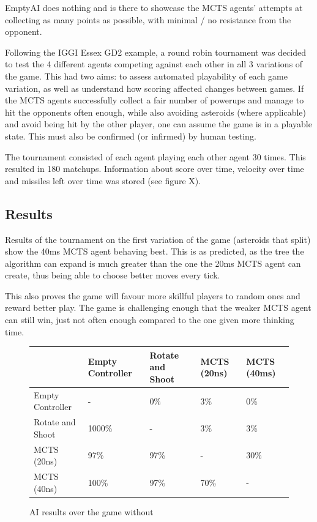 EmptyAI does nothing and is there to showcase the MCTS agents’ attempts at collecting as many points as possible, with minimal / no resistance from the opponent.

Following the IGGI Essex GD2 example, a round robin tournament was decided to test the 4 different agents competing against each other in all 3 variations of the game. This had two aims: to assess automated playability of each game variation, as well as understand how scoring affected changes between games. If the MCTS agents successfully collect a fair number of powerups and manage to hit the opponents often enough, while also avoiding asteroids (where applicable) and avoid being hit by the other player, one can assume the game is in a playable state. This must also be confirmed (or infirmed) by human testing.

The tournament consisted of each agent playing each other agent 30 times. This resulted in 180 matchups. Information about score over time, velocity over time and missiles left over time was stored (see figure X).

\subsection{Results}

Results of the tournament on the first variation of the game (asteroids that split) show the 40ms MCTS agent behaving best. This is as predicted, as the tree the algorithm can expand is much greater than the one the 20ms MCTS agent can create, thus being able to choose better moves every tick. 

This also proves the game will favour more skillful players to random ones and reward better play. The game is challenging enough that the weaker MCTS agent can still win, just not often enough compared to the one given more thinking time.

\begin{figure}
	\caption{AI results over the game without}
	\begin{tabular}{p{7.5em} | p{4.5em} p{4.5em} p{4.5em} p{4.5em}}
		&
			Empty Controller &
			Rotate and Shoot &
			MCTS (20ns) &
			MCTS (40ms) \\ \hline
		Empty Controller &
			-&
			0\% &
			3\% &
			0\% \\
		Rotate and Shoot &
			1000\% &
			-&
			3\% &
			3\% \\ 
		MCTS (20ns) &
			97\% &
			97\% &
			-&
			30\% \\
		MCTS (40ns) &
			100\% &
			97\% &
			70\% &
			-\\
	\end{tabular}
\end{figure}

